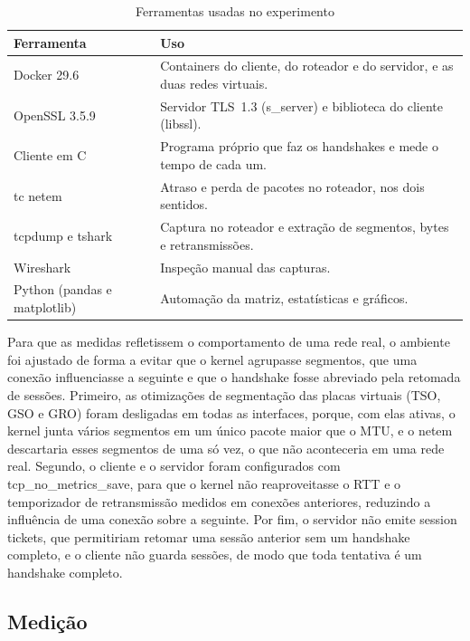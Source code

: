 \documentclass[12pt,a4paper]{article}
\newcommand{\fonte}[1]{\par\vspace{4pt}{\small Fonte: #1}}
\begin{document}
\begin{table}[H]
\centering
\caption{Ferramentas usadas no experimento}
\label{tab:ferramentas-experimento}
\small
\begin{tabular}{p{3.6cm}p{9.2cm}}
\toprule
Ferramenta & Uso \\
\midrule
Docker 29.6 & Containers do cliente, do roteador e do servidor, e as duas redes virtuais. \\
OpenSSL 3.5.9 & Servidor TLS~1.3 (s\_server) e biblioteca do cliente (libssl). \\
Cliente em C & Programa próprio que faz os handshakes e mede o tempo de cada um. \\
tc netem & Atraso e perda de pacotes no roteador, nos dois sentidos. \\
tcpdump e tshark & Captura no roteador e extração de segmentos, bytes e retransmissões. \\
Wireshark & Inspeção manual das capturas. \\
Python (pandas e matplotlib) & Automação da matriz, estatísticas e gráficos. \\
\bottomrule
\end{tabular}
\fonte{Elaborado pelos autores.}
\end{table}

Para que as medidas refletissem o comportamento de uma rede real, o ambiente
foi ajustado de forma a evitar que o kernel agrupasse segmentos, que uma
conexão influenciasse a seguinte e que o handshake fosse abreviado pela
retomada de sessões. Primeiro, as otimizações de segmentação das
placas virtuais (TSO, GSO e GRO) foram desligadas em todas as interfaces,
porque, com elas ativas, o kernel junta vários segmentos em um único pacote
maior que o MTU, e o netem descartaria esses segmentos de uma só vez, o que
não aconteceria em uma rede real. Segundo, o cliente e o servidor foram
configurados com tcp\_no\_metrics\_save, para que o kernel não
reaproveitasse o RTT e o temporizador de retransmissão medidos em conexões
anteriores, reduzindo a influência de uma conexão sobre a seguinte. Por fim, o servidor não emite session tickets, que permitiriam retomar uma
sessão anterior sem um handshake completo, e o cliente não guarda sessões,
de modo que toda tentativa é um handshake completo.

\subsection{Medição}
\label{subsec:medicao}
\end{document}
